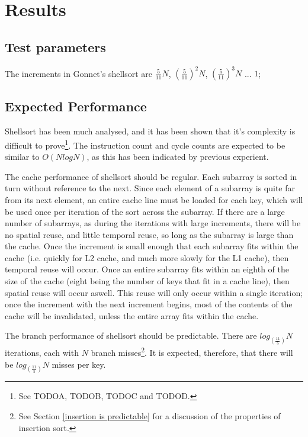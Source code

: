 
\section{Results}
\subsection{Test parameters}
The increments in Gonnet's shellsort are $\frac{5}{11}N$, $(\frac{5}{11})^2N$,
$(\frac{5}{11})^3N$ ... $1$;

\subsection{Expected Performance}
Shellsort has been much analysed, and it has been shown that it's complexity is
difficult to prove\footnote{See TODOA, TODOB, TODOC and TODOD.}. The instruction
count and cycle counts are expected to be similar to $O(NlogN)$, as this has
been indicated by previous experient. 

The cache performance of shellsort should be regular. Each subarray is sorted in
turn without reference to the next. Since each element of a subarray is quite
far from its next element, an entire cache line must be loaded for each key,
which will be used once per iteration of the sort across the subarray. If there
are a large number of subarrays, as during the iterations with large increments,
there will be no spatial reuse, and little temporal reuse, so long as the
subarray is large than the cache. Once the increment is small enough that each
subarray fits within the cache (i.e. quickly for L2 cache, and much more slowly
for the L1 cache), then temporal reuse will occur. Once an entire subarray fits
within an eighth of the size of the cache (eight being the number of keys
that fit in a cache line), then spatial reuse will occur aswell.  This reuse
will only occur within a single iteration; once the increment with the next
increment begins, most of the contents of the cache will be invalidated, unless
the entire array fits within the cache.

The branch performance of shellsort should be predictable. There are
$log_{(\frac{11}{5})}N$ iterations, each with $N$ branch misses\footnote{See Section
\ref{insertion is predictable} for a discussion of the properties of insertion
sort.}. It is expected, therefore, that there will be $log_{(\frac{11}{5})}N$ misses per
key.

